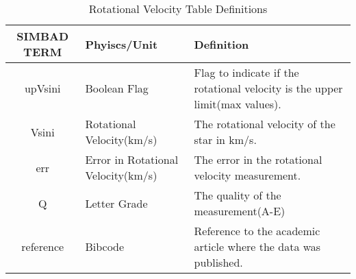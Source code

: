 \documentclass[12pt,oneside,a4paper,english]{article}
\begin{document}
\begin{table}[H]
    \centering
    \caption{Rotational Velocity Table Definitions}
    \begin{tabular}{|c|p{3cm}|p{9cm}|}
    \centering
    \textbf{SIMBAD TERM} & \textbf{Phyiscs/Unit} & \textbf{Definition} \\ \hline \hline
    upVsini & Boolean Flag & Flag to indicate if the rotational velocity is the upper limit(max values).  \\ \hline
    Vsini & Rotational Velocity(km/s) & The rotational velocity of the star in km/s.  \\ \hline
    err & Error in Rotational Velocity(km/s) & The error in the rotational velocity measurement.  \\ \hline
    Q & Letter Grade & The quality of the measurement(A-E)  \\ \hline
    reference & Bibcode & Reference to the academic article where the data was published.  \\ \hline
    \end{tabular}
    \label{tab:table3}
    \end{table}
\end{document}
